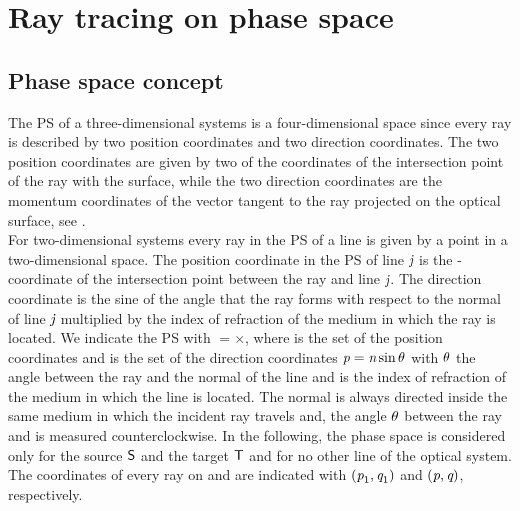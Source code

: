 \chapter{Ray tracing on phase space} \label{chap:PS}
\section{Phase space concept}
The PS of a three-dimensional systems is a four-dimensional space since every ray is described by two position coordinates
and two direction coordinates.
The two position coordinates are given by two of the coordinates of the intersection point of the ray with the surface, while the two direction coordinates are
the momentum coordinates of the vector tangent to the ray projected on the optical surface, see \cite{wolf2004geometric}.
\\ \indent For two-dimensional systems every ray in the PS of a line is given by a point in a two-dimensional space.
The position coordinate in the PS of line $\textit{j}$ is the -coordinate of the intersection point between the ray and line $\textit{j}$.
The direction coordinate is the sine of the angle that the ray forms with respect to the normal of line $\textit{j}$ multiplied by the index of refraction of the medium in which the ray is located.
We indicate the PS with $=$$\times$,
where  is the set of the position coordinates  and  is the set of the direction coordinates $\textit{p}=\textit{n}\sin{\theta}$ with $\theta$ the angle between the ray and the normal \vect{$\boldsymbol{\nu}$} of the line and  is the index of refraction of the medium in which the line is located.  
The normal \vect{$\boldsymbol{\nu}$} is always directed inside the same medium in which the incident ray travels and, 
the angle $\theta$ between the ray and \vect{$\boldsymbol{\nu}$} is measured counterclockwise.
In the following, the phase space is considered only for the source $\textsf{S}$ and the target $\textsf{T}$ and for no other line of the optical system.
The coordinates of every ray on  and  are indicated with $(\textit{p}_1,\textit{q}_1)$ and $(\textit{p},\textit{q})$, respectively. 

